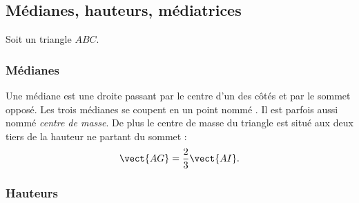 
\subsection{Médianes, hauteurs, médiatrices}

Soit un triangle \( ABC\).

\subsubsection{Médianes}

\begin{multicols}{2}
    Une médiane est une droite passant par le centre d'un des côtés et par le sommet opposé. Les trois médianes se coupent en un point nommé . Il est parfois aussi nommé \emph{centre de masse}. De plus le centre de masse du triangle est situé aux deux tiers de la hauteur ne partant du sommet :
    \begin{equation}
        \vect{ AG }=\frac{ 2 }{ 3 }\vect{ AI }.
    \end{equation}

    \columnbreak


    \begin{center}

    \end{center}

\end{multicols}

\subsubsection{Hauteurs}

